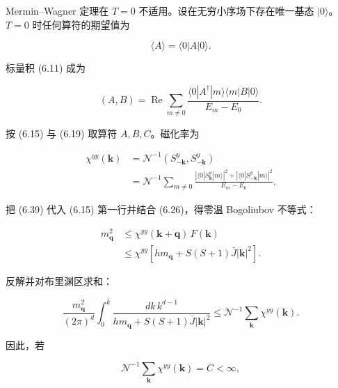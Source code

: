 Mermin--Wagner 定理在 $T = 0$ 不适用。设在无穷小序场下存在唯一基态 $|0\rangle$。$T = 0$ 时任何算符的期望值为

\begin{equation*}
\langle A \rangle = \langle 0 | A | 0 \rangle .
\tag{6.37}
\end{equation*}

标量积 (6.11) 成为

\begin{equation*}
( A, B ) = \operatorname{Re} \sum_ {m \neq 0} \frac {\langle 0 | A ^ {\dagger} | m \rangle \langle m | B | 0 \rangle}{E _ {m} - E _ {0}}.
\tag{6.38}
\end{equation*}

按 (6.15) 与 (6.19) 取算符 $A, B, C$。磁化率为

\begin{align*}
\chi^ {yy} ( \mathbf {k} ) & = \mathcal {N} ^ {- 1} \left( S _ {- \mathbf {k}} ^ {y}, S _ {- \mathbf {k}} ^ {y} \right)\\
& = \mathcal {N} ^ {- 1} \sum_ {m \neq 0} \frac {\left| \langle 0 | S _ {\mathbf {k}} ^ {y} | m \rangle \right| ^ {2} + \left| \langle 0 | S _ {- \mathbf {k}} ^ {y} | m \rangle \right| ^ {2}}{E _ {m} - E _ {0}} .
\tag{6.39}
\end{align*}

把 (6.39) 代入 (6.15) 第一行并结合 (6.26)，得零温 Bogoliubov 不等式：

\begin{align*}
m _ {\mathbf {q}} ^ {2} & \leq \chi^ {yy} ( \mathbf {k} + \mathbf {q} ) \, F ( \mathbf {k} )\\
& \leq \chi^ {yy} \left[ h m _ {\mathbf {q}} + S ( S + 1 ) \bar {J} | \mathbf {k} | ^ {2} \right] .
\tag{6.40}
\end{align*}

反解并对布里渊区求和：

\begin{equation*}
\frac {m _ {\mathbf {q}} ^ {2}}{( 2 \pi ) ^ {d}} \int_ {0} ^ {\bar {k}} \frac {d k \, k ^ {d - 1}}{h m _ {\mathbf {q}} + S ( S + 1 ) \bar {J} | \mathbf {k} | ^ {2}} \leq \mathcal {N} ^ {- 1} \sum_ {\mathbf {k}} \chi^ {yy} ( \mathbf {k} ).
\tag{6.41}
\end{equation*}

因此，若

\begin{equation*}
\mathcal {N} ^ {- 1} \sum_ {\mathbf {k}} \chi^ {yy} ( \mathbf {k} ) = C < \infty ,
\tag{6.42}
\end{equation*}

